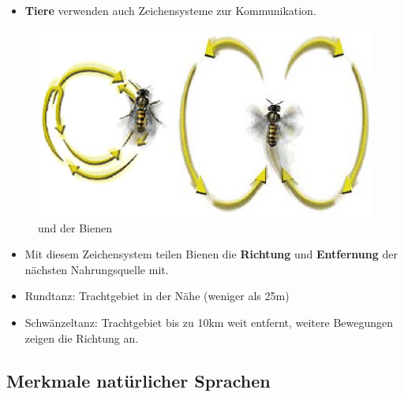 \begin{frame}

\begin{itemize}
	\item<1-> \textbf{Tiere} verwenden auch Zeichensysteme zur Kommunikation.
\end{itemize}			
			
\begin{figure}[H]
\centering

\includegraphics[scale=0.15]{../material/01SSBienentanz}
\caption{ und  der Bienen}
\label{Zeichen2}
\end{figure}

\begin{itemize}
	\item<2-> Mit diesem Zeichensystem teilen Bienen die \textbf{Richtung} und \textbf{Entfernung} der nächsten Nahrungsquelle mit. 
	\item<2-> Rundtanz: Trachtgebiet in der Nähe (weniger als 25m)
	\item<2-> Schwänzeltanz: Trachtgebiet bis zu 10km weit entfernt, weitere Bewegungen zeigen die Richtung an.
\end{itemize}		
		
\end{frame}			


%
\subsection{Merkmale natürlicher Sprachen}
	
